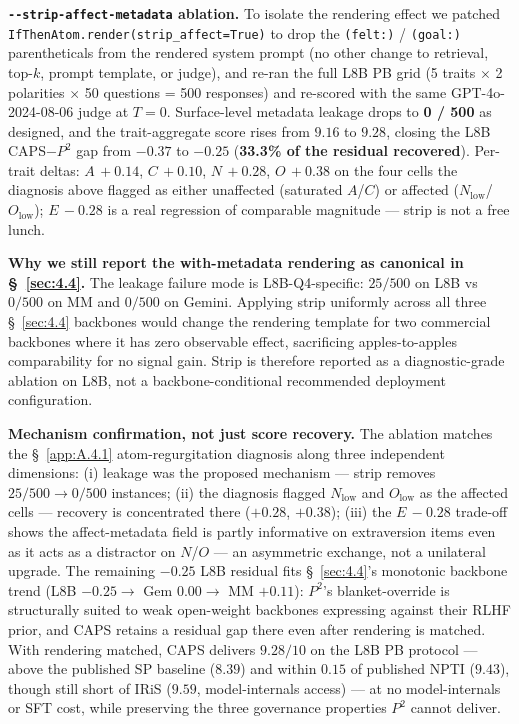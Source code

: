 \textbf{\texttt{-\allowbreak{}-\allowbreak{}strip-\allowbreak{}affect-\allowbreak{}metadata} ablation.} To isolate the rendering effect we patched \texttt{IfThenAtom.\allowbreak{}render(strip\_\allowbreak{}affect=True)} to drop the \texttt{(felt:)} / \texttt{(goal:)} parentheticals from the rendered system prompt (no other change to retrieval, top-$k$, prompt template, or judge), and re-ran the full L8B PB grid (5 traits $\times$ 2 polarities $\times$ 50 questions = 500 responses) and re-scored with the same GPT-4o-2024-08-06 judge at $T = 0$. Surface-level metadata leakage drops to \textbf{0 / 500} as designed, and the trait-aggregate score rises from $9.16$ to $\mathbf{9.28}$, closing the L8B CAPS$-$$P^{\!2}$ gap from $-0.37$ to $-0.25$ (\textbf{33.3\% of the residual recovered}). Per-trait deltas: $A\,{+}0.14$, $C\,{+}0.10$, $N\,{+}0.28$, $O\,{+}0.38$ on the four cells the diagnosis above flagged as either unaffected (saturated $A$/$C$) or affected ($N_\text{low}$/$O_\text{low}$); $E\,{-}0.28$ is a real regression of comparable magnitude --- strip is not a free lunch.

\textbf{Why we still report the with-metadata rendering as canonical in \S~\ref{sec:4.4}.} The leakage failure mode is L8B-Q4-specific: $25 / 500$ on L8B vs $0 / 500$ on MM and $0 / 500$ on Gemini. Applying strip uniformly across all three \S~\ref{sec:4.4} backbones would change the rendering template for two commercial backbones where it has zero observable effect, sacrificing apples-to-apples comparability for no signal gain. Strip is therefore reported as a diagnostic-grade ablation on L8B, not a backbone-conditional recommended deployment configuration.

\textbf{Mechanism confirmation, not just score recovery.} The ablation matches the \S~\ref{app:A.4.1} atom-regurgitation diagnosis along three independent dimensions: (i) leakage was the proposed mechanism --- strip removes $25/500 \to 0/500$ instances; (ii) the diagnosis flagged $N_\text{low}$ and $O_\text{low}$ as the affected cells --- recovery is concentrated there ($+0.28$, $+0.38$); (iii) the $E\,{-}0.28$ trade-off shows the affect-metadata field is partly informative on extraversion items even as it acts as a distractor on $N$/$O$ --- an asymmetric exchange, not a unilateral upgrade. The remaining $-0.25$ L8B residual fits \S~\ref{sec:4.4}'s monotonic backbone trend (L8B $-0.25 \to$ Gem $0.00 \to$ MM $+0.11$): $P^{\!2}$'s blanket-override is structurally suited to weak open-weight backbones expressing against their RLHF prior, and CAPS retains a residual gap there even after rendering is matched. With rendering matched, CAPS delivers $9.28/10$ on the L8B PB protocol --- above the published SP baseline ($8.39$) and within $0.15$ of published NPTI ($9.43$), though still short of IRiS ($9.59$, model-internals access) --- at no model-internals or SFT cost, while preserving the three governance properties $P^{\!2}$ cannot deliver.


